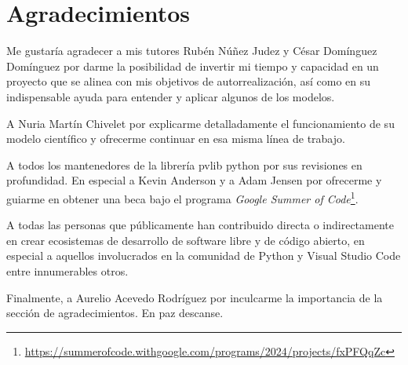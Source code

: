 \chapter*{Agradecimientos} \label{chp:agrad}

Me gustaría agradecer a mis tutores Rubén Núñez Judez y César Domínguez Domínguez por darme la posibilidad de invertir mi tiempo y capacidad en un proyecto que se alinea con mis objetivos de autorrealización, así como en su indispensable ayuda para entender y aplicar algunos de los modelos.

A Nuria Martín Chivelet por explicarme detalladamente el funcionamiento de su modelo científico y ofrecerme continuar en esa misma línea de trabajo.

A todos los mantenedores de la librería pvlib python por sus revisiones en profundidad. En especial a Kevin Anderson y a Adam Jensen por ofrecerme y guiarme en obtener una beca bajo el programa \textit{Google Summer of Code}\footnote{\url{https://summerofcode.withgoogle.com/programs/2024/projects/fxPFQqZc}}.

A todas las personas que públicamente han contribuido directa o indirectamente en crear ecosistemas de desarrollo de software libre y de código abierto, en especial a aquellos involucrados en la comunidad de Python y Visual Studio Code entre innumerables otros.

Finalmente, a Aurelio Acevedo Rodríguez por inculcarme la importancia de la sección de agradecimientos. En paz descanse.

